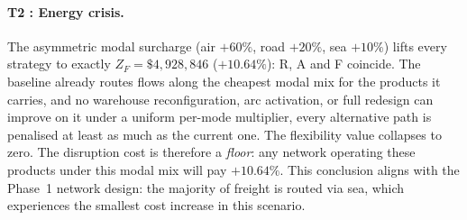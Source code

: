 \begin{table}[H]
\centering
\caption{Network changes vs.\ baseline --- scenario T1.}
\label{tab:network_t1}
\end{table}
 



\paragraph{T2 : Energy crisis.}
The asymmetric modal surcharge (air $+60\%$, road $+20\%$, sea $+10\%$)
lifts every strategy to exactly $Z_F = \$4{,}928{,}846$
($+10.64\%$): R, A and F coincide. The baseline already routes
flows along the cheapest modal mix for the products it carries, and
no warehouse reconfiguration, arc activation, or full redesign can
improve on it under a uniform per-mode multiplier, every alternative
path is penalised at least as much as the current one. The
flexibility value collapses to zero. The disruption cost is therefore
a \emph{floor}: any network operating these products under this
modal mix will pay $+10.64\%$. This conclusion aligns with the Phase~1 network design: the majority of freight is 
routed via sea, which experiences the smallest cost increase in this scenario.

